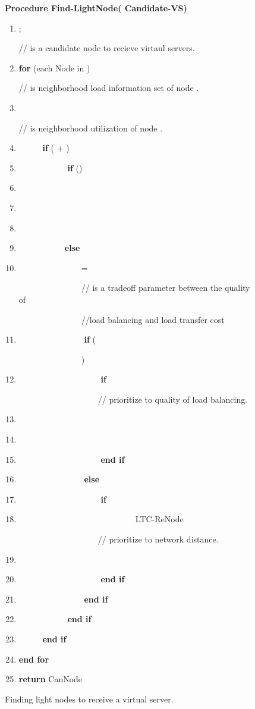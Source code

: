 \documentclass {article}
\begin{document}
\begin{figure}
\scriptsize
{
{ \bf Procedure Find-LightNode( Candidate-VS)}
\begin{enumerate}
\itemsep=0mm
\item {   ; }

 //  is a candidate  node to recieve virtaul servers.
\item  {\bf for} (each Node  in  )

// is  neighborhood load information set of node .
\item \ \ \ \ \  

//   is neighborhood utilization of node .
\item \ \ \ \ \   { \bf if }( +  )
\item \ \ \ \ \   \ \ \ \ \ \ { \bf if} ()
\item \ \ \ \ \   \ \ \ \  \ \ \ \ \ \ 
\item \ \ \ \ \   \ \ \ \  \ \ \ \ \ \ 
\item \ \ \ \ \   \ \ \ \  \ \ \ \ \ \ 
\item \ \ \ \ \   \ \ \ \  \ \ {\bf else}
\item \ \ \ \ \   \ \ \ \  \ \ \ \ \ \ =

 \ \ \ \ \   \ \ \ \  \ \ \ \ \ \ // is a tradeoff parameter between the quality of

 \ \ \ \ \   \ \ \ \  \ \ \ \ \ \ //load balancing and load transfer cost
\item \ \ \ \ \   \ \ \ \  \ \ \ \ \ \ { \bf if} (


 \ \ \ \ \   \ \ \ \  \ \ \ \ \ \ )
\item \ \ \ \ \   \ \ \ \  \ \ \ \ \ \ \ \ \ \  { \bf if} 

\ \ \ \ \   \ \ \ \  \ \ \ \ \ \ \ \ \ \  // prioritize to quality of load balancing.
\item \ \ \ \ \   \ \ \ \  \ \ \ \ \ \ \ \ \ \  \ \ \ \ 
\item \ \ \ \ \ \  \ \ \ \ \ \ \ \ \ \ \ \ \ \ \ \ \ \ \ \ \ \ 
\item \ \ \ \ \   \ \ \ \  \ \ \ \ \ \ \ \ \ \ { \bf end if}
\item \ \ \ \ \   \ \ \ \  \ \ \ \ \ \   { \bf else}
\item \ \ \ \ \   \ \ \ \  \ \ \ \ \ \ \ \ \ \ { \bf if} 
\item \ \ \ \ \ \  \ \ \ \ \ \ \ \ \ \ \ \ \ \   \ \ \ \ \ \ \ \ LTC-ReNode

\ \ \ \ \   \ \ \ \  \ \ \ \ \ \ \ \ \ \ // prioritize to network distance.
\item \ \ \ \ \   \ \ \ \  \ \ \ \ \ \ \ \ \ \ \ \ \ \ 
\item \ \ \ \ \   \ \ \ \  \ \ \ \ \ \ \ \ \ \ { \bf end if}
\item \ \ \ \ \   \ \ \ \  \ \ \ \ \ \   { \bf end if}
\item \ \ \ \ \   \ \ \ \ \ \ { \bf end if}
\item \ \ \ \  \  { \bf end if  }
\item  {\bf end for}
\item { \bf return} CanNode
\end{enumerate}
}
\normalsize
\caption{Finding light nodes to receive a virtual server. \label{Finding}}
\end{figure}
\end{document}
